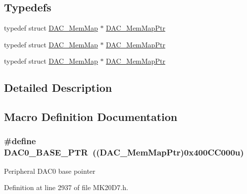 \subsection*{Typedefs}
\begin{DoxyCompactItemize}
\item 
typedef struct \hyperlink{struct_d_a_c___mem_map}{D\+A\+C\+\_\+\+Mem\+Map} $\ast$ \hyperlink{group___d_a_c___peripheral_gaf4fffbe25ce148c577ec740897223a7f}{D\+A\+C\+\_\+\+Mem\+Map\+Ptr}
\item 
typedef struct \hyperlink{struct_d_a_c___mem_map}{D\+A\+C\+\_\+\+Mem\+Map} $\ast$ \hyperlink{group___d_a_c___peripheral_gaf4fffbe25ce148c577ec740897223a7f}{D\+A\+C\+\_\+\+Mem\+Map\+Ptr}
\item 
typedef struct \hyperlink{struct_d_a_c___mem_map}{D\+A\+C\+\_\+\+Mem\+Map} $\ast$ \hyperlink{group___d_a_c___peripheral_gaf4fffbe25ce148c577ec740897223a7f}{D\+A\+C\+\_\+\+Mem\+Map\+Ptr}
\end{DoxyCompactItemize}


\subsection{Detailed Description}


\subsection{Macro Definition Documentation}
\subsubsection[{\texorpdfstring{D\+A\+C0\+\_\+\+B\+A\+S\+E\+\_\+\+P\+TR}{DAC0_BASE_PTR}}]{\setlength{\rightskip}{0pt plus 5cm}\#define D\+A\+C0\+\_\+\+B\+A\+S\+E\+\_\+\+P\+TR~(({\bf D\+A\+C\+\_\+\+Mem\+Map\+Ptr})0x400\+C\+C000u)}\hypertarget{group___d_a_c___peripheral_gabe3b30df06ec04e5c899efd6e49f1800}{}\label{group___d_a_c___peripheral_gabe3b30df06ec04e5c899efd6e49f1800}
Peripheral D\+A\+C0 base pointer 

Definition at line 2937 of file M\+K20\+D7.\+h.

